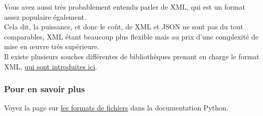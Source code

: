     Vous avez aussi très probablement entendu parler de XML, qui est un
format assez populaire également.\\

Cela dit, la puissance, et donc le coût, de XML et JSON ne sont pas du
tout comparables, XML étant beaucoup plus flexible mais au prix d'une
complexité de mise en œuvre très supérieure.\\

Il existe plusieurs souches différentes de bibliothèques prenant en
charge le format XML,
\href{https://docs.python.org/3/library/xml.html}{qui sont introduites
ici}.

    \hypertarget{pour-en-savoir-plus}{%
\subsubsection{Pour en savoir plus}\label{pour-en-savoir-plus}}

    Voyez la page sur
\href{https://docs.python.org/3/library/fileformats.html}{les formats de
fichiers} dans la documentation Python.
